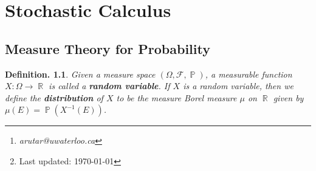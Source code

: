 \documentclass[11pt, a4paper]{memoir}
\title{\subject}
\author{Alex Rutar\thanks{\itshape arutar@uwaterloo.ca}\\ University of Waterloo}
\date{\semester\thanks{Last updated: \today}}
\DeclareMathOperator{\R}{{\mathbb{R}}}
\theoremstyle{change}
\theoremstyle{plain}
\theoremstyle{nonumberplain}
\newtheorem{definition}{Definition.}
\DeclareMathOperator{\pr}{{\mathbb{P}}}
\newcommand{\defn}[1]{{\boldmath\bfseries #1}}
\numberwithin{equation}{section}
\begin{document}
\hypersetup{pageanchor=false}
\maketitle
\newpage
\frontmatter
\hypersetup{pageanchor=true}
\tableofcontents*
\newpage
\mainmatter


\chapter{Stochastic Calculus}
\section{Measure Theory for Probability}
\begin{definition}
    Given a measure space $(\Omega,\mathcal{F},\pr)$, a measurable function $X:\Omega\to\R$ is called a \defn{random variable}.
    If $X$ is a random variable, then we define the \defn{distribution} of $X$ to be the measure Borel measure $\mu$ on $\R$ given by $\mu(E)=\pr(X^{-1}(E))$.
\end{definition}
\end{document}
